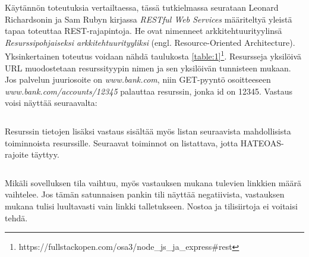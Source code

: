 Käytännön toteutuksia vertailtaessa, tässä tutkielmassa seurataan Leonard Richardsonin ja Sam Rubyn \cite{restful-web-services} kirjassa \textit{RESTful Web Services} määriteltyä yleistä tapaa toteuttaa REST-rajapintoja. He ovat nimenneet arkkitehtuurityylinsä \textit{Resurssipohjaiseksi arkkitehtuurityyliksi} (engl. Resource-Oriented Architecture). Yksinkertainen toteutus voidaan nähdä taulukosta \ref{table:1}\footnote{https://fullstackopen.com/osa3/node\_js\_ja\_express\#rest}. Resursseja yksilöivä URL muodostetaan resurssityypin nimen ja sen yksilöivän tunnisteen mukaan. Jos palvelun juuriosoite on \textit{www.bank.com}, niin GET-pyyntö osoitteeseen \textit{www.bank.com/accounts/12345} palauttaa resurssin, jonka id on 12345. Vastaus voisi näyttää seuraavalta: 

\inputminted{json}{listaukset/rest.json}

Resurssin tietojen lisäksi vastaus sisältää myös listan seuraavista mahdollisista toiminnoista resurssille. Seuraavat toiminnot on listattava, jotta HATEOAS-rajoite täyttyy.

\inputminted{json}{listaukset/rest2.json}

Mikäli sovelluksen tila vaihtuu, myös vastauksen mukana tulevien linkkien määrä vaihtelee. Jos tämän satunnaisen pankin tili näyttää negatiivista, vastauksen mukana tulisi luultavasti vain linkki talletukseen. Nostoa ja tilisiirtoja ei voitaisi tehdä. \cite{restful-web-services, rest-apis-must-be-hypertext-driven}



